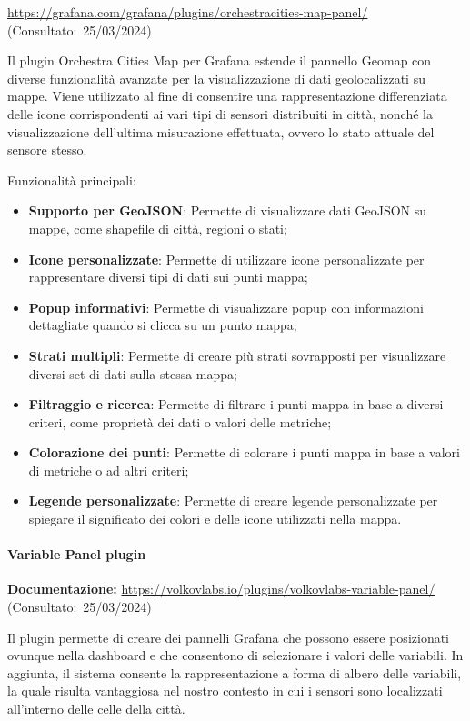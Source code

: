 \url{https://grafana.com/grafana/plugins/orchestracities-map-panel/} (Consultato:~25/03/2024)

Il plugin Orchestra Cities Map per Grafana estende il pannello Geomap con diverse funzionalità avanzate per la visualizzazione di dati geolocalizzati su mappe.
Viene utilizzato al fine di consentire una rappresentazione differenziata delle icone corrispondenti ai vari tipi di sensori distribuiti in città, nonché la visualizzazione dell'ultima misurazione effettuata, ovvero lo stato attuale del sensore stesso.

Funzionalità principali:
\begin{itemize}
    \item \textbf{Supporto per GeoJSON}: Permette di visualizzare dati GeoJSON su mappe, come shapefile di città, regioni o stati;
    \item \textbf{Icone personalizzate}: Permette di utilizzare icone personalizzate per rappresentare diversi tipi di dati sui punti mappa;
    \item \textbf{Popup informativi}: Permette di visualizzare popup con informazioni dettagliate quando si clicca su un punto mappa;
    \item \textbf{Strati multipli}: Permette di creare più strati sovrapposti per visualizzare diversi set di dati sulla stessa mappa;
    \item \textbf{Filtraggio e ricerca}: Permette di filtrare i punti mappa in base a diversi criteri, come proprietà dei dati o valori delle metriche;
    \item \textbf{Colorazione dei punti}: Permette di colorare i punti mappa in base a valori di metriche o ad altri criteri;
    \item \textbf{Legende personalizzate}: Permette di creare legende personalizzate per spiegare il significato dei colori e delle icone utilizzati nella mappa.
\end{itemize}

\paragraph{Variable Panel plugin}
\textbf{Documentazione:}
\url{https://volkovlabs.io/plugins/volkovlabs-variable-panel/} (Consultato:~25/03/2024)


Il plugin permette di creare dei pannelli Grafana che possono essere posizionati ovunque nella dashboard e che consentono di selezionare i valori delle variabili.
In aggiunta, il sistema consente la rappresentazione a forma di albero delle variabili, la quale risulta vantaggiosa nel nostro contesto in cui i sensori sono localizzati all'interno delle celle della città.



